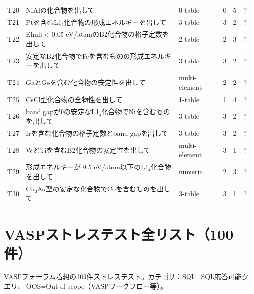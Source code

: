 \documentclass[3p]{elsarticle}
\begin{document}
\begin{longtable}{lp{4.5cm}lccc}
  T20 & NiAlの化合物を出して & 0-table & 0 & 5 & ? \\
  T21 & Ptを含むL1₂化合物の形成エネルギーを出して & 3-table & 3 & 2 & ? \\
  T22 & Ehull < 0.05 eV/atomのB2化合物の格子定数を出して & 2-table & 2 & 3 & ? \\
  T23 & 安定なB2化合物でFeを含むものの形成エネルギーを出して & 3-table & 3 & 2 & ? \\
  T24 & GaとGeを含む化合物の安定性を出して & multi-element & 2 & 2 & ? \\
  T25 & CsCl型化合物の全物性を出して & 1-table & 1 & 4 & ? \\
  T26 & band gapが0の安定なL1₂化合物でNiを含むものを出して & 3-table & 3 & 2 & ? \\
  T27 & Irを含む化合物の格子定数とband gapを出して & 3-table & 3 & 2 & ? \\
  T28 & WとTiを含むB2化合物の安定性を出して & multi-element & 3 & 1 & ? \\
  T29 & 形成エネルギーが-0.5 eV/atom以下のL1₂化合物を出して & numeric & 2 & 3 & ? \\
  T30 & Cu₃Au型の安定な化合物でCoを含むものを出して & 3-table & 3 & 1 & ? \\
\end{longtable}
\newpage

\section{VASPストレステスト全リスト（100件）}
\label{sup:vasp}

VASPフォーラム着想の100件ストレステスト。カテゴリ：SQL=SQL応答可能クエリ、
OOS=Out-of-scope（VASPワークフロー等）。
\end{document}
